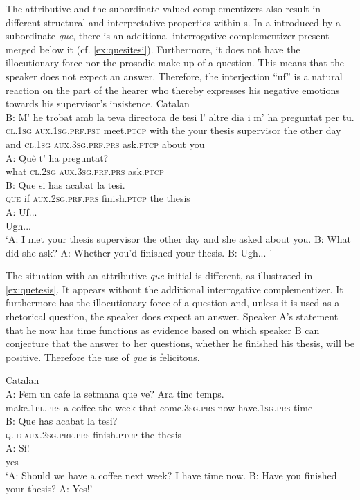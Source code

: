 The attributive  and the subordinate-valued complementizers also result in  different structural and interpretative properties within s. In a  introduced by a subordinate \emph{que}, there is an additional interrogative complementizer present merged below it (cf. \ref{ex:quesitesi}). Furthermore, it does not have the illocutionary force nor the prosodic make-up of a question.  This means that the speaker does not expect an answer. Therefore, the interjection ``uf'' is a natural reaction on the part of the hearer who thereby expresses his negative emotions towards his supervisor's insistence. 
\ea\label{ex:quesitesi} 
Catalan\\
\gll B: M' he trobat amb la teva {directora de tesi} l' altre dia i m' ha preguntat per tu. \\
{} \textsc{cl.1sg} \textsc{aux.1sg.prf.pst} meet.\textsc{ptcp} with the your {thesis supervisor} the other day and \textsc{cl.1sg} \textsc{aux.3sg.prf.prs} ask.\textsc{ptcp} about you\\
\exi{} \gll  A: Què t' ha preguntat?\\
{} what \textsc{cl.2sg} \textsc{aux.3sg.prf.prs} ask.\textsc{ptcp}\\
\exi{} \gll B: Que si has acabat la tesi.\\
{} \textsc{que} if \textsc{aux.2sg.prf.prs} finish.\textsc{ptcp} the thesis\\
\exi{} \gll 
A: Uf...\\
{} Ugh...\\
\glt `A: I met your thesis supervisor the other day and she  asked about you. B: What did  she ask? A: Whether you'd finished your thesis. B: Ugh... '
\z

The situation with an attributive \emph{que}-initial  is different, as illustrated in \eqref{ex:quetesis}. It appears without the additional interrogative complementizer. It furthermore has the illocutionary force of a question and, unless it is used as a rhetorical question, the speaker does expect an answer. Speaker A's statement that he now has time functions as evidence based on which speaker B can conjecture that the answer to her questions, whether he finished his thesis, will be positive. Therefore the use of \emph{que} is felicitous.\largerpage

\ea\label{ex:quetesis}
Catalan\\
\gll A: Fem un cafe la setmana que ve? Ara tinc temps. \\
{} make.\textsc{1pl.prs} a coffee the week that come.\textsc{3sg.prs} now have.\textsc{1sg.prs} time\\
\exi{} \gll B: Que has acabat la tesi?\\
{} \textsc{que} \textsc{aux.2sg.prf.prs} finish.\textsc{ptcp} the thesis \\
\exi{} \gll A: Sí! \\
{} yes\\
\glt `A: Should we have a coffee next week? I have time now. B: Have you finished your thesis? A: Yes!'
\z



